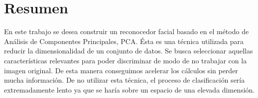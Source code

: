 \section*{Resumen}

En este trabajo se desea construir un reconocedor facial basado en el método de Análisis de Componentes Principales, PCA. Ésta es una técnica utilizada para reducir la dimensionalidad de un conjunto de datos. Se busca seleccionar aquellas características relevantes para poder discriminar de modo de no trabajar con la imagen original. De esta manera conseguimos acelerar los cálculos sin perder mucha información. De no utilizar esta técnica, el proceso de clasificación sería extremadamente lento ya que se haría sobre un espacio de una elevada dimensión.\\

